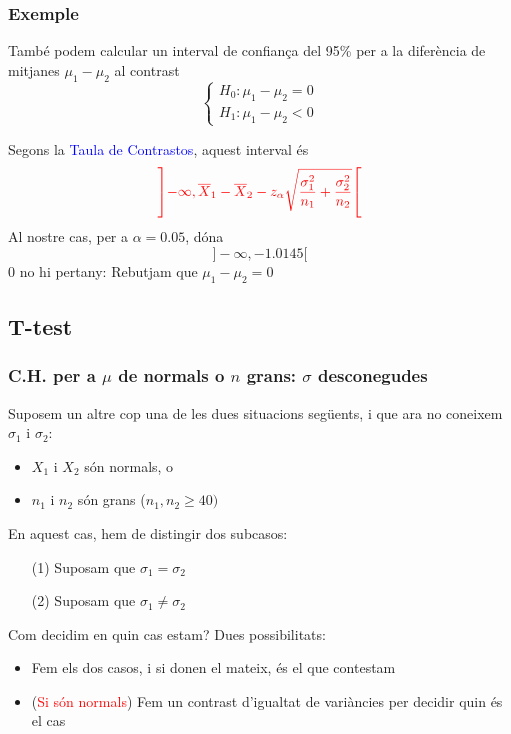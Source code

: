 \documentclass[12pt,t]{beamer}
\newcommand{\red}[1]{\textcolor{red}{#1}}
\newcommand{\blue}[1]{\textcolor{blue}{#1}}
\renewcommand{\emph}[1]{{\color{red}#1}}
\renewcommand{\geq}{\geqslant}
\theoremstyle{plain}
\theoremstyle{definition}
\begin{document}
\begin{frame}
\frametitle{Exemple}
També podem calcular un \emph{interval de confiança} del 95\% per a la
diferència de mitjanes $\mu_1-\mu_2$ al contrast
$$
\left\{\begin{array}{l}
H_0:\mu_1-\mu_2=0\\
H_1:\mu_1- \mu_2<0
\end{array}\right.
$$

Segons la \blue{Taula de Contrastos}, aquest interval és
{\small $$
\red{\left] -\infty, \overline{X}_1 -\overline{X}_2
-z_{\alpha}\sqrt{\frac{\sigma_1^2}{n_1}+\frac{\sigma_2^2}{n_2}}\right[}
$$}
Al nostre cas, per a $\alpha=0.05$, dóna
$$
]-\infty,-1.0145[
$$
0 no hi pertany: \emph{Rebutjam que $\mu_1-\mu_2=0$}

\end{frame}

\subsection{T-test}

\begin{frame}
\frametitle{C.H. per a $\mu$ de normals o $n$ grans: $\sigma$ desconegudes}
\vspace*{-2ex}

Suposem un altre cop una de les dues situacions següents, i que ara no coneixem  $\sigma_1$ i $\sigma_2$:
\begin{itemize}
\item $X_1$ i $X_2$ són normals, o

\item $n_1$ i $n_2$ són grans ($n_1,n_2\geq 40)$
\end{itemize}
\medskip

En aquest cas, hem de distingir dos subcasos:
\begin{enumerate}
\item[(1)] Suposam que $\sigma_1=\sigma_2$
\item[(2)] Suposam que $\sigma_1\neq \sigma_2$
\end{enumerate}
\medskip
\pause

Com decidim en quin cas estam? Dues possibilitats:
\begin{itemize}
\item Fem els dos casos, i si donen el mateix, és el que contestam
\item (\red{Si són normals}) Fem un contrast d'igualtat de variàncies per decidir quin és el cas
\end{itemize}



\end{frame}
\end{document}
